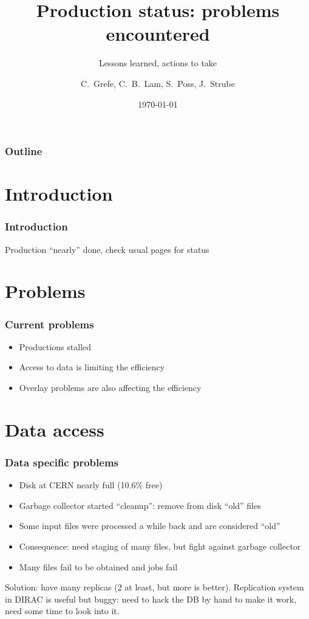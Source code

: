 \documentclass{beamer}
\title{Production status: problems encountered}
\subtitle{Lessons learned, actions to take}
\author{C.~Grefe, C.~B.~Lam, S.~Poss, J.~Strube}
\institute[CERN]
{%
CERN, Switzerland
}
\date{\today}
\begin{document}
\begin{frame}
\titlepage
\end{frame}

\begin{frame}
\frametitle{Outline}
\tableofcontents
\end{frame}

\section{Introduction}
\begin{frame}
\frametitle{Introduction}
Production ``nearly'' done, check usual pages for status
\end{frame}

\section{Problems}
\begin{frame}
\frametitle{Current problems}
\begin{itemize}
  \item \alert{Productions stalled}
  \item Access to \alert{data} is limiting the efficiency
  \item \alert{Overlay problems} are also affecting the efficiency

\end{itemize}
\end{frame}
\section{Data access}
\begin{frame}
\frametitle{Data specific problems}
\begin{itemize}
  \item Disk at CERN \alert{nearly full} (10.6\% free)
  \item Garbage collector started ``cleanup'': remove from disk ``old'' files
  \item Some input files were processed a while back and are considered ``old''
  \item Consequence: need \alert{staging of many files}, but fight against
  garbage collector
  \item Many files fail to be obtained and jobs fail
\end{itemize}
Solution: have many replicas (2 at least, but more is better). Replication
system in DIRAC is useful but buggy: need to hack the DB by hand to make it work, need
some time to look into it.
\end{frame}
\end{document}
